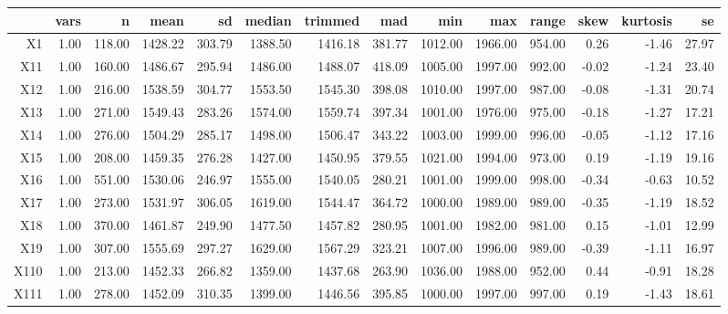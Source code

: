 \begin{tabular}{rrrrrrrrrrrrrr}
  \hline
 & vars & n & mean & sd & median & trimmed & mad & min & max & range & skew & kurtosis & se \\ 
  \hline
X1 & 1.00 & 118.00 & 1428.22 & 303.79 & 1388.50 & 1416.18 & 381.77 & 1012.00 & 1966.00 & 954.00 & 0.26 & -1.46 & 27.97 \\ 
  X11 & 1.00 & 160.00 & 1486.67 & 295.94 & 1486.00 & 1488.07 & 418.09 & 1005.00 & 1997.00 & 992.00 & -0.02 & -1.24 & 23.40 \\ 
  X12 & 1.00 & 216.00 & 1538.59 & 304.77 & 1553.50 & 1545.30 & 398.08 & 1010.00 & 1997.00 & 987.00 & -0.08 & -1.31 & 20.74 \\ 
  X13 & 1.00 & 271.00 & 1549.43 & 283.26 & 1574.00 & 1559.74 & 397.34 & 1001.00 & 1976.00 & 975.00 & -0.18 & -1.27 & 17.21 \\ 
  X14 & 1.00 & 276.00 & 1504.29 & 285.17 & 1498.00 & 1506.47 & 343.22 & 1003.00 & 1999.00 & 996.00 & -0.05 & -1.12 & 17.16 \\ 
  X15 & 1.00 & 208.00 & 1459.35 & 276.28 & 1427.00 & 1450.95 & 379.55 & 1021.00 & 1994.00 & 973.00 & 0.19 & -1.19 & 19.16 \\ 
  X16 & 1.00 & 551.00 & 1530.06 & 246.97 & 1555.00 & 1540.05 & 280.21 & 1001.00 & 1999.00 & 998.00 & -0.34 & -0.63 & 10.52 \\ 
  X17 & 1.00 & 273.00 & 1531.97 & 306.05 & 1619.00 & 1544.47 & 364.72 & 1000.00 & 1989.00 & 989.00 & -0.35 & -1.19 & 18.52 \\ 
  X18 & 1.00 & 370.00 & 1461.87 & 249.90 & 1477.50 & 1457.82 & 280.95 & 1001.00 & 1982.00 & 981.00 & 0.15 & -1.01 & 12.99 \\ 
  X19 & 1.00 & 307.00 & 1555.69 & 297.27 & 1629.00 & 1567.29 & 323.21 & 1007.00 & 1996.00 & 989.00 & -0.39 & -1.11 & 16.97 \\ 
  X110 & 1.00 & 213.00 & 1452.33 & 266.82 & 1359.00 & 1437.68 & 263.90 & 1036.00 & 1988.00 & 952.00 & 0.44 & -0.91 & 18.28 \\ 
  X111 & 1.00 & 278.00 & 1452.09 & 310.35 & 1399.00 & 1446.56 & 395.85 & 1000.00 & 1997.00 & 997.00 & 0.19 & -1.43 & 18.61 \\ 
   \hline
\end{tabular}